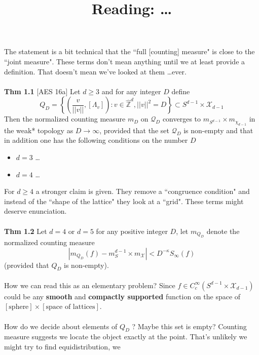 \documentclass[12pt]{article}
\title{Reading: \dots}
\date{}
\begin{document}
\sffamily

\maketitle

{\fontsize{16pt}{16pt}\selectfont 

\noindent  The statement is a bit technical that the ``full [counting] measure" is close to the ``joint measure".  These terms don't mean anything until we at least provide a definition.  That doesn't mean we've looked at them \dots ever. \\ \\
\textbf{Thm 1.1} [AES 16a] Let $d \geq 3$ and for any integer $D$ define
$$ Q_D = 
\left\{ 
\left( \frac{v}{||v||} , [\Lambda_v]   \right) :
v \in \hat{\mathbb{Z}}^d , ||v||^2 = D \right\} 
\subset S^{d-1} \times \mathcal{X}_{d-1} $$
Then the normalized counting measure $m_D$ on $\mathcal{Q}_D$ converges to $m_{S^{d-1}} \times m_{\chi_{d-1}} $ in the weak* topology as $D \to \infty$, provided that the set $\mathcal{Q}_D$ is non-empty and that in addition one has the following conditions on the number $D$ 
\begin{itemize}
\item $d=3$ \dots
\item $d=4$ \dots
\end{itemize}
For $d \geq 4$ a stronger claim is given.  They remove a ``congruence condition" and instead of the ``shape of the lattice"  they look at a ``grid".  These terms might deserve enunciation. \\ \\ 
\textbf{Thm 1.2} Let $d = 4$ or $d = 5$ for any positive integer $D$, let $m_{Q_D}$ denote the normalized counting measure  
$$ |m_{Q_D}(f)  - m_S^{d-1} \times m_{\mathcal{X}}| < D^{-\kappa} S_\infty(f)$$
(provided that $Q_D$ is non-empty). \\ \\
How we can read this as an elementary problem?  Since $f \in C^\infty_c(S^{d-1} \times \mathcal{X}_{d-1})$ could be any \textbf{smooth} and \textbf{compactly supported} function on the space of $[\text{sphere}] \times [\text{space of lattices}]$.  \\ \\
How do we decide about elements of $Q_D$ ? Maybe this set is empty?  Counting measure suggests we locate the object exactly at the point.  That's unlikely we might try to find equidistribution, we \\ \\
}
\end{document}
